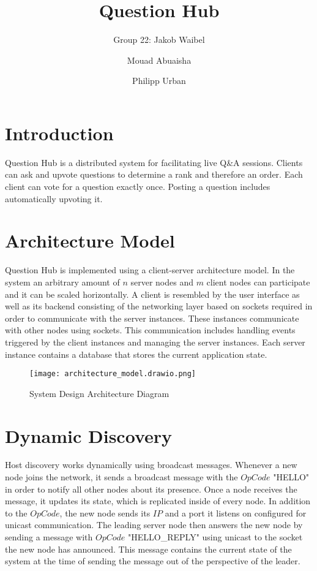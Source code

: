 \documentclass[runningheads]{llncs}
\begin{document}
%
\title{Question Hub}

\author{Group 22: Jakob Waibel \and Mouad Abuaisha \and Philipp Urban}

\institute{}
%
\maketitle              %

\section{Introduction}

Question Hub is a distributed system for facilitating live Q\&A sessions.
Clients can ask and upvote questions to determine a rank and therefore an order.
Each client can vote for a question exactly once.
Posting a question includes automatically upvoting it.

\section{Architecture Model}

Question Hub is implemented using a client-server architecture model.
In the system an arbitrary amount of $n$ server nodes and $m$ client nodes can participate and it can be scaled horizontally. 
A client is resembled by the user interface as well as its backend consisting of the networking layer based on sockets required in order to communicate with the server instances. 
These instances communicate with other nodes using sockets.
This communication includes handling events triggered by the client instances and managing the server instances.
Each server instance contains a database that stores the current application state.

\begin{figure}
    \centering
    \texttt{[image: architecture\_model.drawio.png]}
    \caption{System Design Architecture Diagram}
    \label{fig:enter-label}
\end{figure}
 
\section{Dynamic Discovery}

Host discovery works dynamically using broadcast messages.
Whenever a new node joins the network, it sends a broadcast message with the $OpCode$ "HELLO" in order to notify all other nodes about its presence.
Once a node receives the message, it updates its state, which is replicated inside of every node.
In addition to the $OpCode$, the new node sends its $IP$ and a port it listens on configured for unicast communication.
The leading server node then answers the new node by sending a message with $OpCode$ "HELLO\_REPLY" using unicast to the socket the new node has announced.
This message contains the current state of the system at the time of sending the message out of the perspective of the leader.
 
\end{document}

